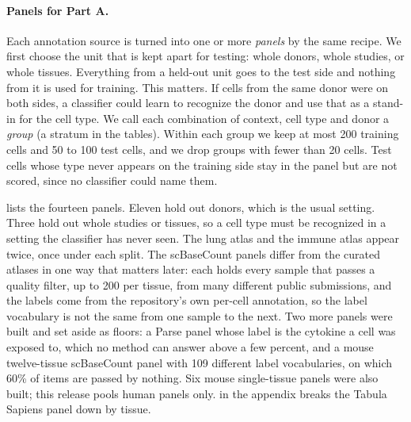 \documentclass[]{style}
\begin{document}
\paragraph{Panels for Part A.}
Each annotation source is turned into one or more \emph{panels} by the same recipe. We
first choose the unit that is kept apart for testing: whole donors, whole studies, or
whole tissues. Everything from a held-out unit goes to the test side and nothing from it
is used for training. This matters. If cells from the same donor were on both sides, a
classifier could learn to recognize the donor and use that as a stand-in for the cell
type. We call each combination of context, cell type and donor a \emph{group} (a stratum
in the tables). Within each group we keep at most 200 training cells and 50 to 100 test
cells, and we drop groups with fewer than 20 cells. Test cells whose type never appears
on the training side stay in the panel but are not scored, since no classifier could name
them.

 lists the fourteen panels. Eleven hold out donors, which is the usual
setting. Three hold out whole studies or tissues, so a cell type must be recognized in a
setting the classifier has never seen. The lung atlas and the immune atlas appear twice,
once under each split. The scBaseCount panels differ from the curated atlases in one way
that matters later: each holds every sample that passes a quality filter, up to 200 per
tissue, from many different public submissions, and the labels come from the
repository's own per-cell annotation, so the label vocabulary is not the same from one
sample to the next. Two more panels were built and set aside as floors: a Parse panel
whose label is the cytokine a cell was exposed to, which no method can answer above a few
percent, and a mouse twelve-tissue scBaseCount panel with 109 different label
vocabularies, on which 60\% of items are passed by nothing. Six mouse single-tissue panels
were also built; this release pools human panels only.  in the
appendix breaks the Tabula Sapiens panel down by tissue.

\begin{table}[t]
\centering
\caption{Part A panels. Cell types counts the distinct labels among a panel's items; none
pass is the fraction of items that no model labels correctly; mean difficulty is on the
pooled scale of , over informative items. Panels hold out whole donors
unless marked otherwise; the held-out units, contexts and groups of every panel are listed
in .}
\label{tab:compA}
\footnotesize

\end{table}
\end{document}
